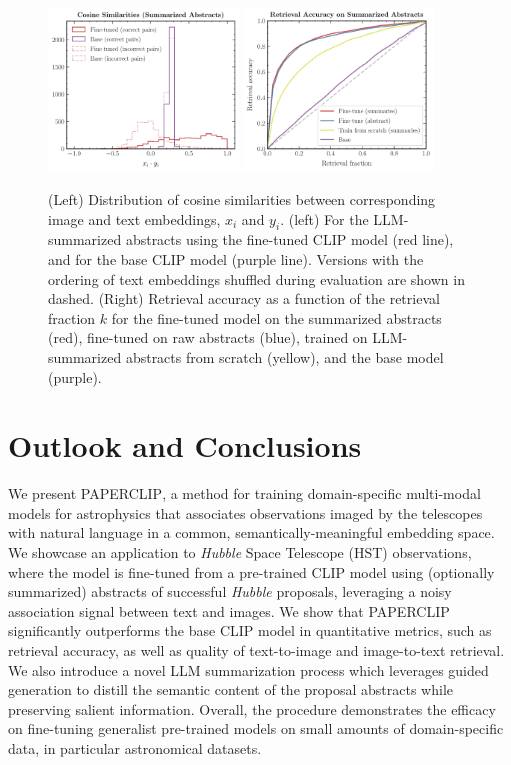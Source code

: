 \documentclass[10pt]{article} %
\newcommand{\hubble}{\emph{Hubble}\xspace}
\begin{document}
\begin{figure}[!h]
\includegraphics[width=0.45\textwidth]{plots/sim_val.pdf}
\includegraphics[width=0.45\textwidth]{plots/retrieval.pdf}
\caption{(Left) Distribution of cosine similarities between corresponding image and text embeddings, $x_i$ and $y_i$. (left) For the LLM-summarized abstracts using the fine-tuned CLIP model (red line), and for the base CLIP model (purple line). Versions with the ordering of text embeddings shuffled during evaluation are shown in dashed. (Right) Retrieval accuracy as a function of the retrieval fraction $k$ for the fine-tuned model on the summarized abstracts (red), fine-tuned on raw abstracts (blue), trained on LLM-summarized abstracts from scratch (yellow), and the base model (purple).}
\label{fig:sim_valtrain}
\end{figure}

\section{Outlook and Conclusions}
\label{sec:conclusion}

We present \textsc{PAPERCLIP}, a method for training domain-specific multi-modal models for astrophysics that associates observations imaged by the telescopes with natural language in a common, semantically-meaningful embedding space.
%
We showcase an application to \hubble Space Telescope (HST) observations, where the model is fine-tuned from a pre-trained CLIP model using (optionally summarized) abstracts of successful \hubble proposals, leveraging a noisy association signal between text and images.
%
We show that \textsc{PAPERCLIP} significantly outperforms the base CLIP model in quantitative metrics, such as retrieval accuracy, as well as quality of text-to-image and image-to-text retrieval.
%
We also introduce a novel LLM summarization process which leverages guided generation to distill the semantic content of the proposal abstracts while preserving salient information. 
%
Overall, the procedure demonstrates the efficacy on fine-tuning generalist pre-trained models on small amounts of domain-specific data, in particular astronomical datasets.
\end{document}

